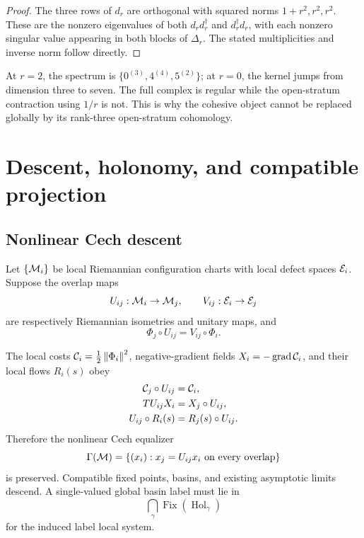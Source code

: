 \documentclass[11pt,a4paper]{article}
\newcommand{\Hol}{\operatorname{Hol}}
\newcommand{\Fix}{\operatorname{Fix}}
\begin{document}
\begin{proof}
The three rows of \(d_r\) are orthogonal with squared norms
\(1+r^2,r^2,r^2\).  These are the nonzero eigenvalues of both
\(d_rd_r^{\dagger}\) and \(d_r^{\dagger}d_r\), with each nonzero singular
value appearing in both blocks of \(\Delta_r\).  The stated multiplicities
and inverse norm follow directly.
\end{proof}

At \(r=2\), the spectrum is
\(\{0^{(3)},4^{(4)},5^{(2)}\}\); at \(r=0\), the kernel jumps from dimension
three to seven.  The full complex is regular while the open-stratum
contraction using \(1/r\) is not.  This is why the cohesive object cannot be
replaced globally by its rank-three open-stratum cohomology.

\section{Descent, holonomy, and compatible projection}
\label{sec:descent-projection}

\subsection{Nonlinear Cech descent}

Let \(\{\mathcal{M}_i\}\) be local Riemannian configuration charts with local
defect spaces \(\mathcal{E}_i\).  Suppose the overlap maps
\[
U_{ij}:\mathcal{M}_i\to\mathcal{M}_j,
\qquad
V_{ij}:\mathcal{E}_i\to\mathcal{E}_j
\]
are respectively Riemannian isometries and unitary maps, and
\begin{equation}
\Phi_j\circ U_{ij}=V_{ij}\circ\Phi_i.
\label{eq:defect-descent}
\end{equation}

\begin{theorem}
\label{thm:repair-descent}
The local costs \(\mathcal{C}_i=\frac12\left\lVert \Phi_i \right\rVert^2\), negative-gradient
fields \(X_i=-\operatorname{grad}\mathcal{C}_i\), and their local flows \(R_i(s)\) obey
\begin{align}
\mathcal{C}_j\circ U_{ij}&=\mathcal{C}_i,\\
TU_{ij}X_i&=X_j\circ U_{ij},\\
U_{ij}\circ R_i(s)&=R_j(s)\circ U_{ij}.
\end{align}
Therefore the nonlinear Cech equalizer
\[
\Gamma(\mathcal{M})=
\{(x_i):x_j=U_{ij}x_i\text{ on every overlap}\}
\]
is preserved.  Compatible fixed points, basins, and existing asymptotic
limits descend.  A single-valued global basin label must lie in
\[
\bigcap_{\gamma}\Fix(\Hol_{\gamma})
\]
for the induced label local system.
\end{theorem}
\end{document}

